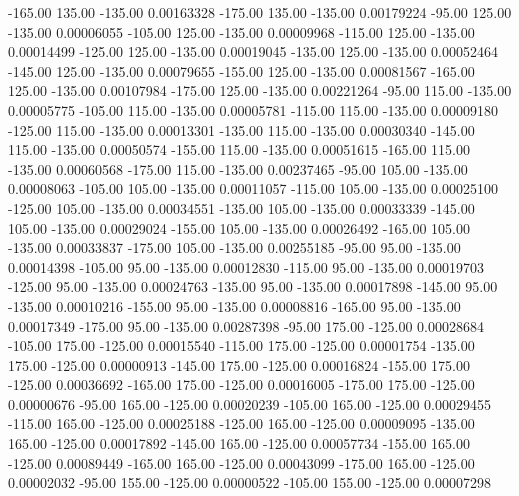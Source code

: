    -165.00    135.00   -135.00     0.00163328
   -175.00    135.00   -135.00     0.00179224
    -95.00    125.00   -135.00     0.00006055
   -105.00    125.00   -135.00     0.00009968
   -115.00    125.00   -135.00     0.00014499
   -125.00    125.00   -135.00     0.00019045
   -135.00    125.00   -135.00     0.00052464
   -145.00    125.00   -135.00     0.00079655
   -155.00    125.00   -135.00     0.00081567
   -165.00    125.00   -135.00     0.00107984
   -175.00    125.00   -135.00     0.00221264
    -95.00    115.00   -135.00     0.00005775
   -105.00    115.00   -135.00     0.00005781
   -115.00    115.00   -135.00     0.00009180
   -125.00    115.00   -135.00     0.00013301
   -135.00    115.00   -135.00     0.00030340
   -145.00    115.00   -135.00     0.00050574
   -155.00    115.00   -135.00     0.00051615
   -165.00    115.00   -135.00     0.00060568
   -175.00    115.00   -135.00     0.00237465
    -95.00    105.00   -135.00     0.00008063
   -105.00    105.00   -135.00     0.00011057
   -115.00    105.00   -135.00     0.00025100
   -125.00    105.00   -135.00     0.00034551
   -135.00    105.00   -135.00     0.00033339
   -145.00    105.00   -135.00     0.00029024
   -155.00    105.00   -135.00     0.00026492
   -165.00    105.00   -135.00     0.00033837
   -175.00    105.00   -135.00     0.00255185
    -95.00     95.00   -135.00     0.00014398
   -105.00     95.00   -135.00     0.00012830
   -115.00     95.00   -135.00     0.00019703
   -125.00     95.00   -135.00     0.00024763
   -135.00     95.00   -135.00     0.00017898
   -145.00     95.00   -135.00     0.00010216
   -155.00     95.00   -135.00     0.00008816
   -165.00     95.00   -135.00     0.00017349
   -175.00     95.00   -135.00     0.00287398
    -95.00    175.00   -125.00     0.00028684
   -105.00    175.00   -125.00     0.00015540
   -115.00    175.00   -125.00     0.00001754
   -135.00    175.00   -125.00     0.00000913
   -145.00    175.00   -125.00     0.00016824
   -155.00    175.00   -125.00     0.00036692
   -165.00    175.00   -125.00     0.00016005
   -175.00    175.00   -125.00     0.00000676
    -95.00    165.00   -125.00     0.00020239
   -105.00    165.00   -125.00     0.00029455
   -115.00    165.00   -125.00     0.00025188
   -125.00    165.00   -125.00     0.00009095
   -135.00    165.00   -125.00     0.00017892
   -145.00    165.00   -125.00     0.00057734
   -155.00    165.00   -125.00     0.00089449
   -165.00    165.00   -125.00     0.00043099
   -175.00    165.00   -125.00     0.00002032
    -95.00    155.00   -125.00     0.00000522
   -105.00    155.00   -125.00     0.00007298
